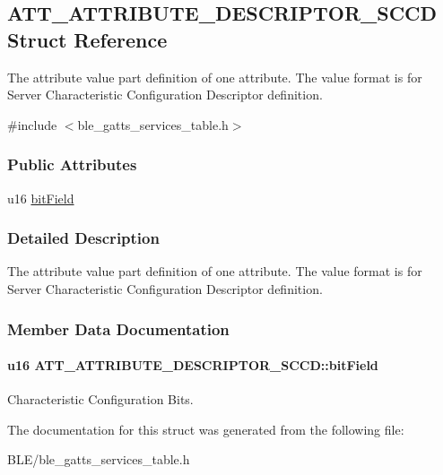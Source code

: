 \hypertarget{struct_a_t_t___a_t_t_r_i_b_u_t_e___d_e_s_c_r_i_p_t_o_r___s_c_c_d}{}\subsection{A\+T\+T\+\_\+\+A\+T\+T\+R\+I\+B\+U\+T\+E\+\_\+\+D\+E\+S\+C\+R\+I\+P\+T\+O\+R\+\_\+\+S\+C\+CD Struct Reference}
\label{struct_a_t_t___a_t_t_r_i_b_u_t_e___d_e_s_c_r_i_p_t_o_r___s_c_c_d}


The attribute value part definition of one attribute. The value format is for Server Characteristic Configuration Descriptor definition.  




{\ttfamily \#include $<$ble\+\_\+gatts\+\_\+services\+\_\+table.\+h$>$}

\subsubsection*{Public Attributes}
\begin{DoxyCompactItemize}
\item 
u16 \hyperlink{struct_a_t_t___a_t_t_r_i_b_u_t_e___d_e_s_c_r_i_p_t_o_r___s_c_c_d_a880f806009e8112edc9c52e371834802}{bit\+Field}
\end{DoxyCompactItemize}


\subsubsection{Detailed Description}
The attribute value part definition of one attribute. The value format is for Server Characteristic Configuration Descriptor definition. 

\subsubsection{Member Data Documentation}
\paragraph[{\texorpdfstring{bit\+Field}{bitField}}]{\setlength{\rightskip}{0pt plus 5cm}u16 A\+T\+T\+\_\+\+A\+T\+T\+R\+I\+B\+U\+T\+E\+\_\+\+D\+E\+S\+C\+R\+I\+P\+T\+O\+R\+\_\+\+S\+C\+C\+D\+::bit\+Field}\hypertarget{struct_a_t_t___a_t_t_r_i_b_u_t_e___d_e_s_c_r_i_p_t_o_r___s_c_c_d_a880f806009e8112edc9c52e371834802}{}\label{struct_a_t_t___a_t_t_r_i_b_u_t_e___d_e_s_c_r_i_p_t_o_r___s_c_c_d_a880f806009e8112edc9c52e371834802}
Characteristic Configuration Bits. 

The documentation for this struct was generated from the following file\+:\begin{DoxyCompactItemize}
\item 
B\+L\+E/ble\+\_\+gatts\+\_\+services\+\_\+table.\+h\end{DoxyCompactItemize}
